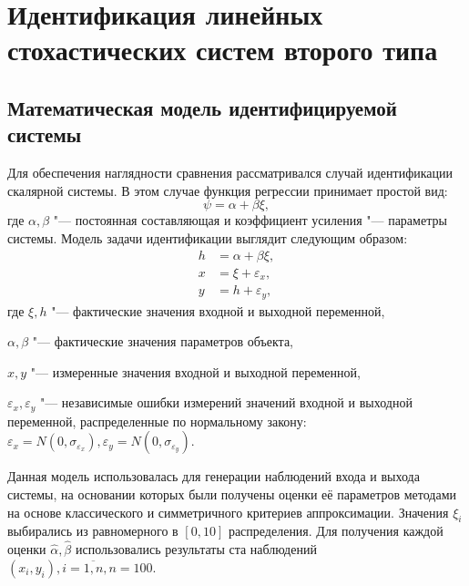 \chapter[Идентификация линейных стохастических систем второго типа]{%
  Идентификация линейных стохастических систем второго типа
}

\section{Математическая модель идентифицируемой системы}

Для обеспечения наглядности сравнения рассматривался случай идентификации скалярной системы.
В этом случае функция регрессии принимает простой вид:
\begin{equation}
  \psi = \alpha + \beta \xi,
  \label{eq:fun_linear_scalar}
\end{equation}
где \( \alpha, \beta \) "--- постоянная составляющая и коэффициент усиления "---
параметры системы. Модель задачи идентификации выглядит следующим образом:
\begin{equation}
  \label{eq:model_linear_scalar}
  \begin{aligned}
  h &= \alpha + \beta \xi, \\
  x &= \xi + \varepsilon_x, \\
  y &= h + \varepsilon_y,
  \end{aligned}
\end{equation}
где \( \xi, h \) "--- фактические значения входной и выходной переменной, \par
\( \alpha, \beta \) "--- фактические значения параметров объекта, \par
\( x, y \) "--- измеренные значения входной и выходной переменной, \par
\( \varepsilon_x, \varepsilon_y \) "--- независимые ошибки измерений значений входной и
выходной переменной, распределенные по нормальному закону:
\(
\varepsilon_x = N(0, \sigma_{\varepsilon_x}),
\varepsilon_y = N(0, \sigma_{\varepsilon_y})
\).

Данная модель использовалась для генерации наблюдений входа и выхода системы,
на основании которых были получены оценки её параметров методами на основе
классического и симметричного критериев аппроксимации.
Значения \( \xi_i \) выбирались из равномерного в \( [0, 10] \) распределения.
Для получения каждой оценки \( \hat{\alpha}, \hat{\beta} \) использовались результаты
ста наблюдений \( ( x_i, y_i ), i = \overline{1, n}, n = 100 \).

